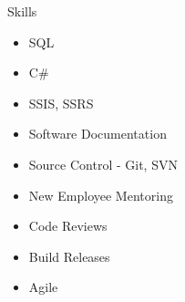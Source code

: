 \documentclass{resume} %
\begin{document}



\begin{rSection}{Skills}
\begin{multicols}{3}
\begin{enumerate}
\begin{itemize}
\item SQL
\item C\# 
\item SSIS, SSRS
\item Software Documentation
\item Source Control - Git, SVN
\item New Employee Mentoring
\item Code Reviews
\item Build Releases
\item Agile
\end{itemize}
\end{enumerate}
\end{multicols}
\end{rSection}

\end{document}
